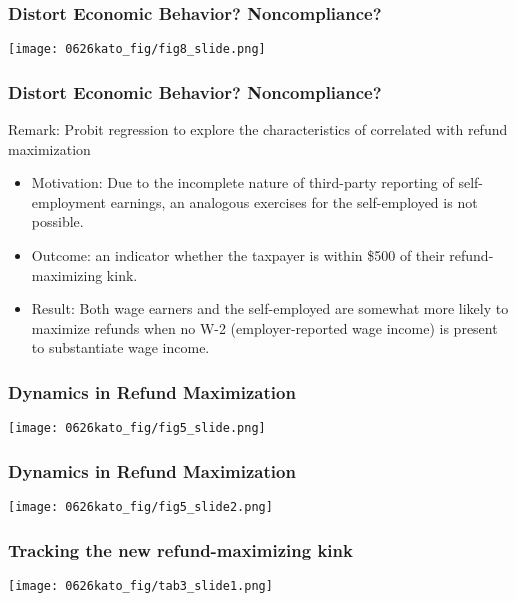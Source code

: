 \documentclass[unicode,12pt]{beamer}
\begin{document}
    \begin{frame}
        \frametitle{Distort Economic Behavior? Noncompliance?}
    
        \centerline{\texttt{[image: 0626kato\_fig/fig8\_slide.png]}}
    
    \end{frame}

    \begin{frame}
        \frametitle{Distort Economic Behavior? Noncompliance?}
    
        Remark: Probit regression to explore the characteristics of correlated with refund maximization
        \begin{itemize}
            \item Motivation: Due to the incomplete nature of third-party reporting of self-employment earnings, an analogous exercises for the self-employed is not possible.
            \item Outcome: an indicator whether the taxpayer is within \$500 of their refund-maximizing kink.
            \item Result: Both wage earners and the self-employed are somewhat more likely to maximize refunds when no W-2 (employer-reported wage income) is present to substantiate wage income.
        \end{itemize}
    
    \end{frame}

    \begin{frame}
        \frametitle{Dynamics in Refund Maximization}
    
        \centerline{\texttt{[image: 0626kato\_fig/fig5\_slide.png]}}
    
    \end{frame}

    \begin{frame}
        \frametitle{Dynamics in Refund Maximization}
    
        \centerline{\texttt{[image: 0626kato\_fig/fig5\_slide2.png]}}
    
    \end{frame}

    \begin{frame}
        \frametitle{Tracking the new refund-maximizing kink}
    
        \centerline{\texttt{[image: 0626kato\_fig/tab3\_slide1.png]}}
    
    \end{frame}
\end{document}
